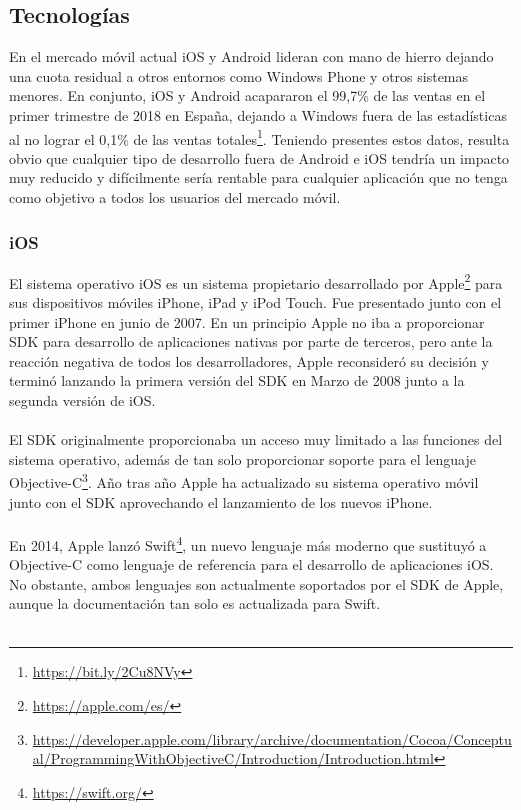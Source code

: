 \documentclass[a4paper, 12pt]{article}
\begin{document}
\subsection{Tecnologías}
\label{sec-2-1}
En el mercado móvil actual iOS y Android lideran con mano de hierro dejando una cuota residual a otros
entornos como Windows Phone y otros sistemas menores. En conjunto, iOS y Android acapararon el 99,7\% de
las ventas en el primer trimestre de 2018 en España, dejando a Windows fuera de las estadísticas al no lograr
el 0,1\% de las ventas totales\footnote{\url{https://bit.ly/2Cu8NVy}}. Teniendo presentes estos datos, resulta obvio que cualquier tipo de desarrollo
fuera de Android e iOS tendría un impacto muy reducido y difícilmente sería rentable para cualquier aplicación
que no tenga como objetivo a todos los usuarios del mercado móvil.
\subsubsection{iOS}
\label{sec-2-1-1}
El sistema operativo iOS es un sistema propietario desarrollado por Apple\footnote{\url{https://apple.com/es/}} para sus dispositivos
móviles iPhone, iPad y iPod Touch. Fue presentado junto con el primer iPhone en junio de 2007. En un
principio Apple no iba a proporcionar SDK para desarrollo de aplicaciones nativas por parte de terceros,
pero ante la reacción negativa de todos los desarrolladores, Apple reconsideró su decisión y terminó
lanzando la primera versión del SDK en Marzo de 2008 junto a la segunda versión de iOS.
\\
\\
El SDK originalmente proporcionaba un acceso muy limitado a las funciones del sistema operativo,
además de tan solo proporcionar soporte para el lenguaje Objective-C\footnote{\url{https://developer.apple.com/library/archive/documentation/Cocoa/Conceptual/ProgrammingWithObjectiveC/Introduction/Introduction.html}}. Año tras año Apple ha
actualizado su sistema operativo móvil junto con el SDK aprovechando el lanzamiento de los nuevos iPhone.
\\
\\
En 2014, Apple lanzó Swift\footnote{\url{https://swift.org/}}, un nuevo lenguaje más moderno que sustituyó a Objective-C como
lenguaje de referencia para el desarrollo de aplicaciones iOS. No obstante, ambos lenguajes son actualmente
soportados por el SDK de Apple, aunque la documentación tan solo es actualizada para Swift.
\\
\\
\end{document}
